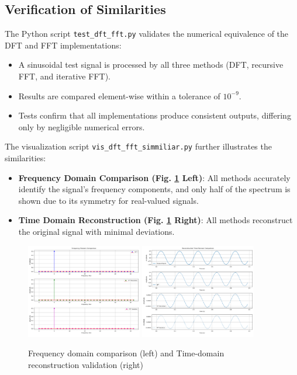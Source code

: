 \documentclass[12pt, a4paper]{report}
\begin{document}
\subsection{Verification of Similarities}
The Python script \texttt{test\_dft\_fft.py} validates the numerical equivalence of the \ac{DFT} and \ac{FFT} implementations:
\begin{itemize}
	\item A sinusoidal test signal is processed by all three methods (\ac{DFT}, recursive \ac{FFT}, and iterative \ac{FFT}).
	\item Results are compared element-wise within a tolerance of \(10^{-9}\).
	\item Tests confirm that all implementations produce consistent outputs, differing only by negligible numerical errors.
\end{itemize}
\noindent The visualization script \texttt{vis\_dft\_fft\_simmiliar.py} further illustrates the similarities:
\begin{itemize}
	\item \textbf{Frequency Domain Comparison (Fig. \ref{fig:frequency_domain_comparison} Left)}: All methods accurately identify the signal's frequency components, and only half of the spectrum is shown due to its symmetry for real-valued signals.
	\item \textbf{Time Domain Reconstruction (Fig. \ref{fig:frequency_domain_comparison} Right)}: All methods reconstruct the original signal with minimal deviations.
\end{itemize}

\begin{figure}[h!]
	\centering
	\includegraphics[width=0.45\textwidth]{2023_11_29_Bilder_Dokumentation/Frequency_Domain_Comparison.png}
	\includegraphics[width=0.45\textwidth]{2023_11_29_Bilder_Dokumentation/Time_Domain_Comparison.png}
	\caption{Frequency domain comparison (left) and Time-domain reconstruction validation (right)}
	\label{fig:frequency_domain_comparison}
\end{figure}
\end{document}
